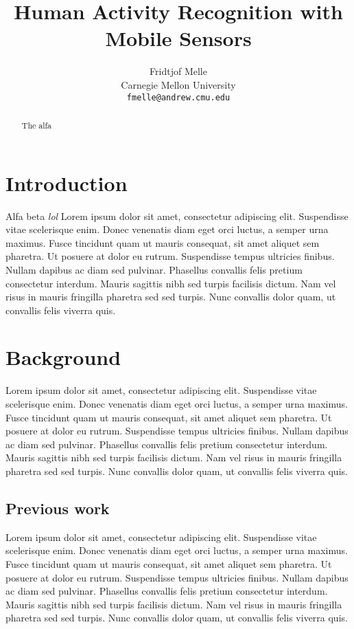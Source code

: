 \documentclass{sig-alternate}
\begin{document}
\title{Human Activity Recognition with Mobile Sensors}

\author{
Fridtjof Melle\\
Carnegie Mellon University\\
{\tt fmelle@andrew.cmu.edu}
}

\maketitle

\begin{abstract}
   The alfa

   
\end{abstract}

\section{Introduction}
Alfa beta \textit{lol} Lorem ipsum dolor sit amet, consectetur adipiscing elit. Suspendisse vitae scelerisque enim. Donec venenatis diam eget orci luctus, a semper urna maximus. Fusce tincidunt quam ut mauris consequat, sit amet aliquet sem pharetra. Ut posuere at dolor eu rutrum. Suspendisse tempus ultricies finibus. Nullam dapibus ac diam sed pulvinar. Phasellus convallis felis pretium consectetur interdum. Mauris sagittis nibh sed turpis facilisis dictum. Nam vel risus in mauris fringilla pharetra sed sed turpis. Nunc convallis dolor quam, ut convallis felis viverra quis\cite{KorBell}\cite{BellKor}.


\section{Background}
Lorem ipsum dolor sit amet, consectetur adipiscing elit. Suspendisse vitae scelerisque enim. Donec venenatis diam eget orci luctus, a semper urna maximus. Fusce tincidunt quam ut mauris consequat, sit amet aliquet sem pharetra. Ut posuere at dolor eu rutrum. Suspendisse tempus ultricies finibus. Nullam dapibus ac diam sed pulvinar. Phasellus convallis felis pretium consectetur interdum. Mauris sagittis nibh sed turpis facilisis dictum. Nam vel risus in mauris fringilla pharetra sed sed turpis. Nunc convallis dolor quam, ut convallis felis viverra quis.

\subsection{Previous work}
Lorem ipsum dolor sit amet, consectetur adipiscing elit. Suspendisse vitae scelerisque enim. Donec venenatis diam eget orci luctus, a semper urna maximus. Fusce tincidunt quam ut mauris consequat, sit amet aliquet sem pharetra. Ut posuere at dolor eu rutrum. Suspendisse tempus ultricies finibus. Nullam dapibus ac diam sed pulvinar. Phasellus convallis felis pretium consectetur interdum. Mauris sagittis nibh sed turpis facilisis dictum. Nam vel risus in mauris fringilla pharetra sed sed turpis. Nunc convallis dolor quam, ut convallis felis viverra quis.
\end{document}
